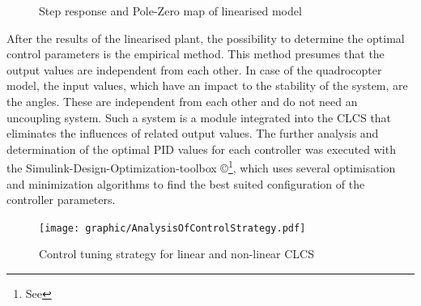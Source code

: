 \begin{figure}[H]
\begin{center}
\hfill
{}
\caption{Step response and Pole-Zero map of linearised model} 
\label{fig:phi_psi_theta_lin_0}
\end{center}
\end{figure}

After the results of the linearised plant, the possibility to determine the optimal control parameters is the empirical method. 
This method presumes that the output values are independent from each other. In case of the quadrocopter model, the input values, which have an impact to the stability of the system, are the angles. These are independent from each other and do not need an uncoupling system. Such a system is a module integrated into the \gls{CLCS} that eliminates the influences of related output values. The further analysis and determination of the optimal \gls{PID} values for each controller was executed with the Simulink-Design-Optimization-toolbox \copyright \footnote{See }, which uses several optimisation and minimization algorithms to find the best suited configuration of the controller parameters.

\begin{figure}[H]
	\centering
		\texttt{[image: graphic/AnalysisOfControlStrategy.pdf]}
	\caption{Control tuning strategy for linear and non-linear CLCS}
	\label{fig:AnalysisOfControlStrategy.pdf}
\end{figure}

